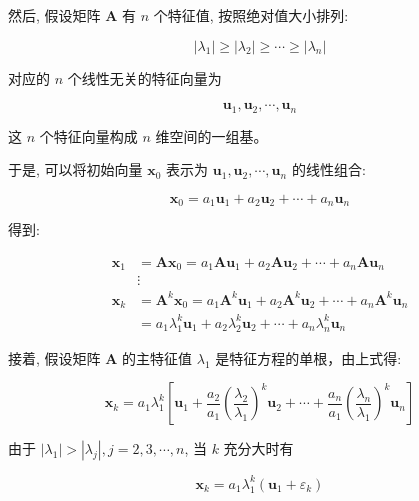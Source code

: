 \documentclass[10pt]{article}
\begin{document}
\begin{CJK*}{UTF8}{bsmi}
然后, 假设矩阵 $\boldsymbol{A}$ 有 $n$ 个特征值, 按照绝对值大小排列:

$$
\left|\lambda_{1}\right| \geqslant\left|\lambda_{2}\right| \geqslant \cdots \geqslant\left|\lambda_{n}\right|
$$

对应的 $n$ 个线性无关的特征向量为

$$
\boldsymbol{u}_{1}, \boldsymbol{u}_{2}, \cdots, \boldsymbol{u}_{n}
$$

这 $n$ 个特征向量构成 $n$ 维空间的一组基。

于是, 可以将初始向量 $\boldsymbol{x}_{0}$ 表示为 $\boldsymbol{u}_{1}, \boldsymbol{u}_{2}, \cdots, \boldsymbol{u}_{n}$ 的线性组合:

$$
\boldsymbol{x}_{0}=a_{1} \boldsymbol{u}_{1}+a_{2} \boldsymbol{u}_{2}+\cdots+a_{n} \boldsymbol{u}_{n}
$$

得到:

$$
\begin{aligned}
\boldsymbol{x}_{1} & =\boldsymbol{A} \boldsymbol{x}_{0}=a_{1} \boldsymbol{A} \boldsymbol{u}_{1}+a_{2} \boldsymbol{A} \boldsymbol{u}_{2}+\cdots+a_{n} \boldsymbol{A} \boldsymbol{u}_{n} \\
& \vdots \\
\boldsymbol{x}_{k} & =\boldsymbol{A}^{k} \boldsymbol{x}_{0}=a_{1} \boldsymbol{A}^{k} \boldsymbol{u}_{1}+a_{2} \boldsymbol{A}^{k} \boldsymbol{u}_{2}+\cdots+a_{n} \boldsymbol{A}^{k} \boldsymbol{u}_{n} \\
& =a_{1} \lambda_{1}^{k} \boldsymbol{u}_{1}+a_{2} \lambda_{2}^{k} \boldsymbol{u}_{2}+\cdots+a_{n} \lambda_{n}^{k} \boldsymbol{u}_{n}
\end{aligned}
$$

接着, 假设矩阵 $\boldsymbol{A}$ 的主特征值 $\lambda_{1}$ 是特征方程的单根，由上式得:


\begin{equation*}
\boldsymbol{x}_{k}=a_{1} \lambda_{1}^{k}\left[\boldsymbol{u}_{1}+\frac{a_{2}}{a_{1}}\left(\frac{\lambda_{2}}{\lambda_{1}}\right)^{k} \boldsymbol{u}_{2}+\cdots+\frac{a_{n}}{a_{1}}\left(\frac{\lambda_{n}}{\lambda_{1}}\right)^{k} \boldsymbol{u}_{n}\right] \tag{21.16}
\end{equation*}


由于 $\left|\lambda_{1}\right|>\left|\lambda_{j}\right|, j=2,3, \cdots, n$, 当 $k$ 充分大时有


\begin{equation*}
\boldsymbol{x}_{k}=a_{1} \lambda_{1}^{k}\left(\boldsymbol{u}_{1}+\varepsilon_{k}\right) \tag{21.17}
\end{equation*}



\end{CJK*}
\end{document}
